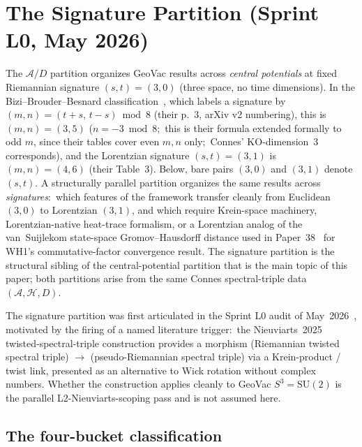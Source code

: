 \documentclass[twocolumn,pra,amsmath,amssymb,superscriptaddress]{revtex4-2}
\begin{document}
\section{The Signature Partition (Sprint L0, May 2026)}
\label{sec:signature_partition}

The $\mathcal{A}/D$ partition organizes GeoVac results across
\emph{central potentials} at fixed Riemannian signature
$(s, t) = (3, 0)$ (three space, no time dimensions).  In the
Bizi--Brouder--Besnard classification~\cite{bizi_brouder_besnard2018},
which labels a signature by $(m, n) = (t + s,\, t - s) \bmod 8$ (their
p.~3, arXiv v2 numbering), this is $(m, n) = (3, 5)$ ($n = -3 \bmod 8$;\
this is their formula extended formally to odd $m$, since their tables
cover even $m, n$ only;\ Connes' KO-dimension~3 corresponds),
and the Lorentzian signature $(s, t) = (3, 1)$ is $(m, n) = (4, 6)$
(their Table~3).  Below, bare pairs $(3, 0)$ and $(3, 1)$ denote
$(s, t)$.  A structurally parallel
partition organizes the same results across \emph{signatures}:\
which features of the framework transfer cleanly from Euclidean $(3, 0)$
to Lorentzian $(3, 1)$, and which require Krein-space machinery,
Lorentzian-native heat-trace formalism, or a Lorentzian analog of the
van~Suijlekom state-space Gromov--Hausdorff distance used in
Paper~38~\cite{paper38} for WH1's commutative-factor convergence result.  The signature partition is the structural sibling
of the central-potential partition that is the main topic of this
paper; both partitions arise from the same Connes spectral-triple data
$(\mathcal{A}, \mathcal{H}, D)$.

The signature partition was first articulated in the Sprint L0 audit
of May~2026~\cite{lorentzian_l0_memo}, motivated by the firing of a
named literature trigger:\ the Nieuviarts~2025~\cite{nieuviarts2025a}
twisted-spectral-triple construction provides a morphism
(Riemannian twisted spectral triple) $\to$ (pseudo-Riemannian spectral
triple) via a Krein-product / twist link, presented as an alternative
to Wick rotation without complex numbers.  Whether the construction
applies cleanly to GeoVac $S^3 = \mathrm{SU}(2)$ is the parallel
L2-Nieuviarts-scoping pass and is not assumed here.

\subsection{The four-bucket classification}
\label{sec:sig_buckets}
\end{document}
